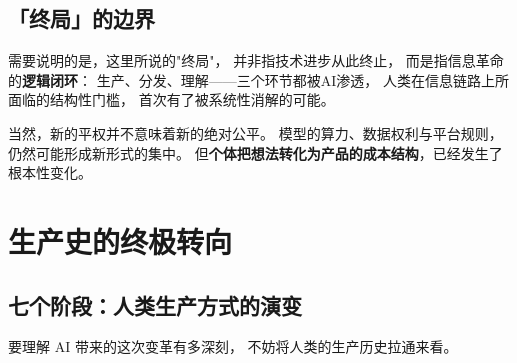 \documentclass[12pt, a4paper, openany]{book}
\newcommand{\key}[1]{\textbf{\color{AccentBlue}#1}}
\begin{document}
\subsection{「终局」的边界}

需要说明的是，这里所说的"终局"，
并非指技术进步从此终止，
而是指信息革命的\key{逻辑闭环}：
生产、分发、理解——三个环节都被AI渗透，
人类在信息链路上所面临的结构性门槛，
首次有了被系统性消解的可能。

当然，新的平权并不意味着新的绝对公平。
模型的算力、数据权利与平台规则，仍然可能形成新形式的集中。
但\key{个体把想法转化为产品的成本结构}，已经发生了根本性变化。

\section{生产史的终极转向}

\subsection{七个阶段：人类生产方式的演变}

要理解 AI 带来的这次变革有多深刻，
不妨将人类的生产历史拉通来看。

\vspace{14pt}
\end{document}
